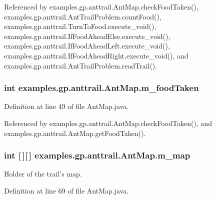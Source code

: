 Referenced by examples.\-gp.\-anttrail.\-Ant\-Map.\-check\-Food\-Taken(), examples.\-gp.\-anttrail.\-Ant\-Trail\-Problem.\-count\-Food(), examples.\-gp.\-anttrail.\-Turn\-To\-Food.\-execute\-\_\-void(), examples.\-gp.\-anttrail.\-If\-Food\-Ahead\-Else.\-execute\-\_\-void(), examples.\-gp.\-anttrail.\-If\-Food\-Ahead\-Left.\-execute\-\_\-void(), examples.\-gp.\-anttrail.\-If\-Food\-Ahead\-Right.\-execute\-\_\-void(), and examples.\-gp.\-anttrail.\-Ant\-Trail\-Problem.\-read\-Trail().

\hypertarget{classexamples_1_1gp_1_1anttrail_1_1_ant_map_aa2c81b0a2aeb5f8e3429221c257d368b}{
\subsubsection[{m\-\_\-food\-Taken}]{\setlength{\rightskip}{0pt plus 5cm}int examples.\-gp.\-anttrail.\-Ant\-Map.\-m\-\_\-food\-Taken\hspace{0.3cm}{\ttfamily [private]}}}\label{classexamples_1_1gp_1_1anttrail_1_1_ant_map_aa2c81b0a2aeb5f8e3429221c257d368b}


Definition at line 49 of file Ant\-Map.\-java.



Referenced by examples.\-gp.\-anttrail.\-Ant\-Map.\-check\-Food\-Taken(), and examples.\-gp.\-anttrail.\-Ant\-Map.\-get\-Food\-Taken().

\hypertarget{classexamples_1_1gp_1_1anttrail_1_1_ant_map_a35615fc03c2049d64f24775e5600c88a}{
\subsubsection[{m\-\_\-map}]{\setlength{\rightskip}{0pt plus 5cm}int \mbox{[}$\,$\mbox{]}\mbox{[}$\,$\mbox{]} examples.\-gp.\-anttrail.\-Ant\-Map.\-m\-\_\-map\hspace{0.3cm}{\ttfamily [private]}}}\label{classexamples_1_1gp_1_1anttrail_1_1_ant_map_a35615fc03c2049d64f24775e5600c88a}
Holder of the trail's map. 

Definition at line 69 of file Ant\-Map.\-java.



